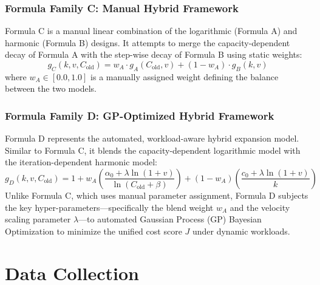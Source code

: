 \subsubsection{Formula Family C: Manual Hybrid Framework}
Formula C is a manual linear combination of the logarithmic (Formula A) and 
harmonic (Formula B) designs. It attempts to merge the capacity-dependent decay 
of Formula A with the step-wise decay of Formula B using static weights:
\begin{equation}
    g_C(k, v, C_{\text{old}}) = w_A \cdot g_A(C_{\text{old}}, v) + (1 - w_A) \cdot g_B(k, v)
\end{equation}
where $w_A \in [0.0, 1.0]$ is a manually assigned weight defining the balance 
between the two models.

\subsubsection{Formula Family D: GP-Optimized Hybrid Framework}
Formula D represents the automated, workload-aware hybrid expansion model. 
Similar to Formula C, it blends the capacity-dependent logarithmic model with the 
iteration-dependent harmonic model:
\begin{equation}
    g_D(k, v, C_{\text{old}}) = 1 + w_A \left( \frac{\alpha_0 + \lambda \ln(1+v)}{\ln(C_{\text{old}} + \beta)} \right) + (1 - w_A) \left( \frac{c_0 + \lambda \ln(1+v)}{k} \right)
\end{equation}
Unlike Formula C, which uses manual parameter assignment, Formula D subjects the 
key hyper-parameters—specifically the blend weight $w_A$ and the velocity scaling 
parameter $\lambda$—to automated Gaussian Process (GP) Bayesian Optimization to 
minimize the unified cost score $J$ under dynamic workloads.

\section{Data Collection}

